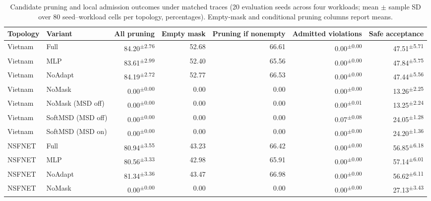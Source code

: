 \documentclass[final,5p]{elsarticle}
\begin{document}
\begin{table}[t]
\centering
\caption{Candidate pruning and local admission outcomes under matched traces (20 evaluation seeds across four workloads; mean $\pm$ sample SD over 80 seed--workload cells per topology, percentages). Empty-mask and conditional pruning columns report means.}
\label{tab:mask_admission}
\scriptsize
\begin{tabular}{llrrrrr}
\toprule
Topology & Variant & All pruning & Empty mask & Pruning if nonempty & Admitted violations & Safe acceptance \\
\midrule
Vietnam & Full & 84.20\textsuperscript{$\pm$2.76} & 52.68 & 66.61 & 0.00\textsuperscript{$\pm$0.00} & 47.51\textsuperscript{$\pm$5.71} \\
Vietnam & MLP & 83.61\textsuperscript{$\pm$2.99} & 52.40 & 65.56 & 0.00\textsuperscript{$\pm$0.00} & 47.84\textsuperscript{$\pm$5.75} \\
Vietnam & NoAdapt & 84.19\textsuperscript{$\pm$2.72} & 52.77 & 66.53 & 0.00\textsuperscript{$\pm$0.00} & 47.44\textsuperscript{$\pm$5.56} \\
Vietnam & NoMask & 0.00\textsuperscript{$\pm$0.00} & 0.00 & 0.00 & 0.00\textsuperscript{$\pm$0.00} & 13.26\textsuperscript{$\pm$2.25} \\
Vietnam & NoMask (MSD off) & 0.00\textsuperscript{$\pm$0.00} & 0.00 & 0.00 & 0.00\textsuperscript{$\pm$0.01} & 13.25\textsuperscript{$\pm$2.24} \\
Vietnam & SoftMSD (MSD off) & 0.00\textsuperscript{$\pm$0.00} & 0.00 & 0.00 & 0.07\textsuperscript{$\pm$0.08} & 24.05\textsuperscript{$\pm$1.28} \\
Vietnam & SoftMSD (MSD on) & 0.00\textsuperscript{$\pm$0.00} & 0.00 & 0.00 & 0.00\textsuperscript{$\pm$0.00} & 24.20\textsuperscript{$\pm$1.36} \\
NSFNET & Full & 80.94\textsuperscript{$\pm$3.55} & 43.23 & 66.42 & 0.00\textsuperscript{$\pm$0.00} & 56.85\textsuperscript{$\pm$6.18} \\
NSFNET & MLP & 80.56\textsuperscript{$\pm$3.33} & 42.98 & 65.91 & 0.00\textsuperscript{$\pm$0.00} & 57.14\textsuperscript{$\pm$6.01} \\
NSFNET & NoAdapt & 81.34\textsuperscript{$\pm$3.36} & 43.47 & 66.98 & 0.00\textsuperscript{$\pm$0.00} & 56.62\textsuperscript{$\pm$6.11} \\
NSFNET & NoMask & 0.00\textsuperscript{$\pm$0.00} & 0.00 & 0.00 & 0.00\textsuperscript{$\pm$0.00} & 27.13\textsuperscript{$\pm$3.43} \\

\end{tabular}
\end{table}
\end{document}
